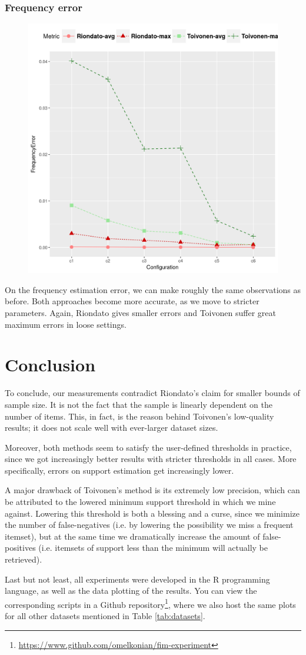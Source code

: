 \documentclass[11pt]{sigplanconf}
\newcommand{\site}[1]{\footnote{\url{#1}}}
\begin{document}
\subsubsection{Frequency error}
\begin{figure}[h!]
\centering
\includegraphics[width=.7\columnwidth]{kosarak.dat/freq.png}
\end{figure}
On the frequency estimation error, we can make roughly the same observations as before. Both approaches become more accurate, as we move to stricter parameters. Again, Riondato gives smaller errors and Toivonen suffer great maximum errors in loose settings.

\section{Conclusion}
To conclude, our measurements contradict Riondato's claim for smaller bounds of sample size. It is not the fact that the sample is linearly dependent on the number of items. This, in fact, is the reason behind Toivonen's low-quality results; it does not scale well with ever-larger dataset sizes.

Moreover, both methods seem to satisfy the user-defined thresholds in practice, since we got increasingly better results with stricter thresholds in all cases. More specifically, errors on support estimation get increasingly lower.

A major drawback of Toivonen's method is its extremely low precision, which can be attributed to the lowered minimum support threshold in which we mine against. Lowering this threshold is both a blessing and a curse, since we minimize the number of false-negatives (i.e. by lowering the possibility we miss a frequent itemset), but at the same time we dramatically increase the amount of false-positives (i.e. itemsets of support less than the minimum will actually be retrieved).

Last but not least, all experiments were developed in the R programming language, as well as the data plotting of the results. You can view the corresponding scripts in a Github repository\site{https://www.github.com/omelkonian/fim-experiment}, where we also host the same plots for all other datasets mentioned in Table \ref{tab:datasets}.
\end{document}
